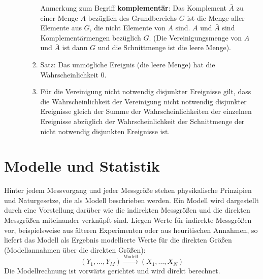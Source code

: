 \begin{raggedright}
\begin{enumerate}
\begin{itemize}
\begin{enumerate}
		Anmerkung zum Begriff \textbf{komplementär}: Das Komplement $\bar A$ zu einer Menge $A$ bezüglich des
		Grundbereichs $G$ ist die Menge aller Elemente aus $G$, die nicht Elemente von $A$ sind.
		$A$ und $\bar A$ sind Komplementärmengen bezüglich $G$.
		(Die Vereinigungsmenge von $A$ und $\bar A$ ist dann $G$ und die Schnittmenge ist die leere Menge).
	\item Satz: Das unmögliche Ereignis (die leere Menge) hat die Wahrscheinlichkeit 0.
	\item Für die Vereinigung nicht notwendig disjunkter Ereignisse gilt, dass die
		Wahrscheinlichkeit der Vereinigung nicht notwendig disjunkter Ereignisse gleich der
		Summe der Wahrscheinlichkeiten der einzelnen Ereignisse abzüglich der
		Wahrscheinlichkeit der Schnittmenge der nicht notwendig disjunkten Ereignisse ist.
	\end{enumerate}
\end{itemize}

\end{enumerate}
\end{raggedright}

\section{Modelle und Statistik}
\label{ModelleStatistik}

Hinter jedem Messvorgang und jeder Messgröße stehen physikalische Prinzipien und Naturgesetze, die
als Modell beschrieben werden. Ein Modell wird dargestellt durch eine Vorstellung darüber wie die
indirekten Messgrößen und die direkten Messgrößen miteinander verknüpft sind. Liegen Werte für indirekte
Messgrößen vor, beispielsweise aus älteren Experimenten oder aus heuritischen Annahmen, so liefert
das Modell als Ergebnis modellierte Werte für die direkten Größen (Modellannahmen über die direkten Größen):
\begin{equation}
(Y_1, \dots, Y_M) \xrightarrow{\mathrm{Modell}} (X_1, \dots, X_N)
\label{forwardModel}
\end{equation}
Die Modellrechnung ist vorwärts gerichtet und wird direkt berechnet.

